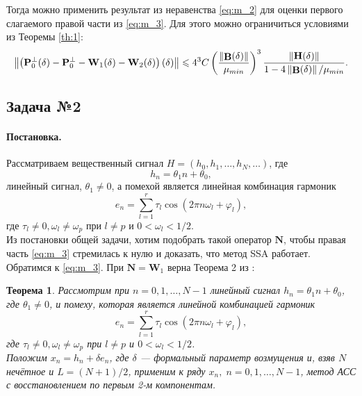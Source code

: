 \documentclass[specialist,
substylefile = spbu_report.rtx,
subf,href,colorlinks=true, 12pt]{disser}
\newcommand\norm[1]{\left\|#1\right\|}
\let\H\relax
\DeclareMathOperator\H{\mathbf{H}}
\DeclareMathOperator\B{\mathbf{B}}
\newtheorem{theorem}{Теорема}
\newenvironment{statement}{\paragraph{Постановка.}}{\hfill}
\begin{document}
	Тогда можно применить результат из неравенства \eqref{eq:m_2} для оценки первого слагаемого правой части из \eqref{eq:m_3}. Для этого можно ограничиться условиями из Теоремы \ref{th:1}:
	\begin{equation}
		\label{eq:noneq_2}
		\norm{\left(\mathbf{P}_0^\bot(\delta) - \mathbf{P}_0^\bot - \mathbf{W}_1(\delta) - \mathbf{W}_2(\delta)\right)\H(\delta)} \leqslant 4^3C\left(\dfrac{\norm{\B(\delta)}}{\mu_{min}}\right)^3\dfrac{\|\mathbf{H}(\delta)\|}{1-4\norm{\B(\delta)}/\mu_{min}}.
	\end{equation}
	\subsection{Задача №2}
	\begin{statement}
		Рассматриваем вещественный сигнал $H = (h_0, h_1, \dots, h_N, \dots)$, где 
		\begin{equation*}
			h_n = \theta_1n+\theta_0,
		\end{equation*}
		линейный сигнал, $\theta_1\neq0$, а помехой является линейная комбинация гармоник
		\begin{equation*}
			e_n = \sum^r_{l=1}\tau_l\cos(2\pi n\omega_l + \varphi_l),
		\end{equation*} 
		где $\tau_l\neq0, \omega_l \neq \omega_p$ при $l\neq p$ и $0 < \omega_l < 1/2$.
		\\Из постановки общей задачи, хотим подобрать такой оператор $\mathbf{N}$, чтобы правая часть \eqref{eq:m_3} стремилась к нулю и доказать, что метод SSA работает.
		\\Обратимся к \eqref{eq:m_3}. При $\mathbf{N} = \mathbf{W}_1$ верна Теорема 2 из \cite{ZNekrutkin}:
		\begin{theorem}\label{th:3}
			Рассмотрим при $n=0,1,\dots,N-1$ линейный сигнал $h_n = \theta_1n+\theta_0$, где $\theta_1 \neq 0$, и помеху, которая является линейной комбинацией гармоник
			\begin{equation*}
				e_n = \sum^r_{l=1}\tau_l\cos(2\pi n\omega_l + \varphi_l),
			\end{equation*} 
			\emph{где} $\tau_l\neq0, \omega_l \neq \omega_p$ \emph{при} $l\neq p$ и $0 < \omega_l < 1/2$.\\
			Положим $x_n = h_n + \delta e_n$, где $\delta$ --- формальный параметр возмущения и, взяв $N$ нечётное и $L = (N+1)/2$, применим к ряду $x_n,\; n=0,1,\dots, N-1$, метод АСС с восстановлением по первым 2-м компонентам.\\

\end{theorem}
\end{statement}
\end{document}

